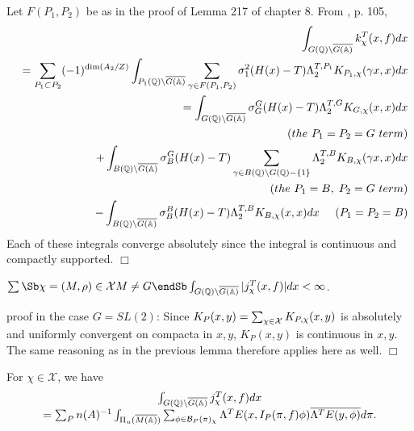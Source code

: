 Let $F(P_1,P_2)$ be as in the proof of Lemma 217 of chapter 8.
From \cite{A3}, p. 105, 
\begin{eqnarray*}
&&\int_{G({\Bbb{Q}})\backslash \overline{G({\Bbb{A}})}}
k_\chi ^T(x,f)dx \\
&&=\sum_{P_1\subset P_2}(-1)^{\dim (A_2/Z)}
\int_{P_1({\Bbb{Q}})\backslash \overline{G({\Bbb{A}})}}
\sum_{\gamma \in F(P_1,P_2)}\sigma _1^2(H(x)-T)
\Lambda_2^{T,P_1}K_{P_1,\chi }(\gamma x,x)dx \\
&&=\int_{G({\Bbb{Q}})\backslash \overline{G({\Bbb{A}})}}
\sigma _G^G(H(x)-T)\Lambda_2^{T,G}K_{G,\chi }(x,x)dx\\
&&\;\;\;\;\;(the\ P_1=P_2=G\ term) \\
&&+\int_{B({\Bbb{Q}})\backslash \overline{G({\Bbb{A}})}}
\sigma _B^G(H(x)-T)
\sum_{\gamma\in B({\Bbb{Q}})\backslash G({\Bbb{Q}})-\{1\}}
\Lambda _2^{T,B}K_{B,\chi }(\gamma x,x)dx\\
&&\;\;\;\;\;(the\ P_1 =B,\;P_2=G\ term) \\
&&-\int_{B({\Bbb{Q}})\backslash \overline{G({\Bbb{A}})}}
\sigma _B^B(H(x)-T)\Lambda_2^{T,B}K_{B,\chi }(x,x)dx
\;\;\;\;\;(P_1 =P_2=B)
\end{eqnarray*}
Each of these integrals converge absolutely since the integral is continuous
and compactly supported. $\Box $

\begin{lemma}
$\sum\Sb \chi =(M,\rho )\in \mathcal{X} \\ M\neq G \\  \endSb
\int_{G({\Bbb{Q}})\backslash \overline{G({\Bbb{A}})}}
|j_\chi ^T(x,f)|dx<\infty $.
\end{lemma}

proof in the case $G=SL(2)$: Since
$K_P(x,y)=\sum_{\chi \in {\cal{X}}}K_{P,\chi }(x,y)$
is absolutely and uniformly convergent on compacta in
$x,y $, $K_P(x,y)$ is continuous in $x,y$. The same
reasoning as in the
previous lemma therefore applies here as well. $\Box $

\begin{lemma}
For $\chi \in \mathcal{X}$, we have 
\[
\begin{array}{c}
\int_{G({\Bbb{Q}})\backslash \overline{G({\Bbb{A}})}}
j_\chi^T(x,f)dx\\
=\sum_Pn(A)^{-1}
\int_{\Pi _u(\overline{M({\Bbb{A}})})}
\sum_{\phi \in {\cal{B}}_P(\pi )_\chi }
\Lambda ^TE(x,I_P(\pi ,f)\phi )\overline{\Lambda ^TE(y,\phi )}d\pi .
\end{array}
\]
\end{lemma}

